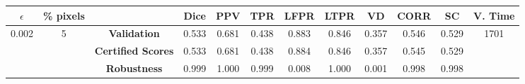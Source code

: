 \begin{longtable}{ c  c | c | c  c  c  c  c  c  c c c}
\toprule \textbf{$\epsilon$} & \textbf{\% pixels} & & \textbf{Dice} & \textbf{PPV} & \textbf{TPR} & \textbf{LFPR} & \textbf{LTPR} & \textbf{VD} & \textbf{CORR} & \textbf{SC} & \textbf{V. Time} \\
\midrule 
\multirow{3}{*}{0.002}  & \multirow{3}{*}{5} &\textbf{Validation} & 0.533 & 0.681 & 0.438 & 0.883 & 0.846 & 0.357 & 0.546 & 0.529 & \multirow{3}{*}{1701} \\
 & & \textbf{Certified Scores} & 0.533 & 0.681 & 0.438 & 0.884 & 0.846 & 0.357 & 0.545 & 0.529 & \\
& & \textbf{Robustness} & 0.999 & 1.000 & 0.999 & 0.008 & 1.000 & 0.001 & 0.998 & 0.998 & \\
\end{longtable}